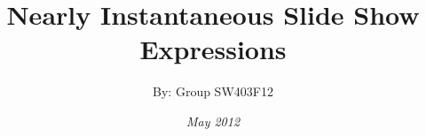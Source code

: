 \title{Nearly Instantaneous Slide Show Expressions}
\author{By: Group SW403F12}
\date{\emph{May 2012}}
\maketitle
\newpage
